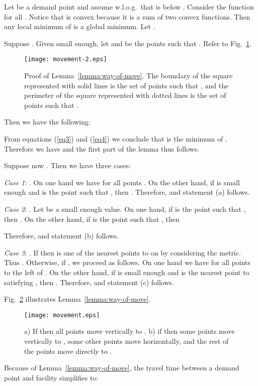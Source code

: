\documentclass[11pt,a4paper,oneside,onecolumn]{article}
\def\QED{\ensuremath{{\square}}}
\def\markatright#1{\leavevmode\unskip\nobreak\quad\hspace*{\fill}{#1}}
\newenvironment{proof}
{\begin{trivlist}\item[\hskip\labelsep{\bf Proof.}]}
{\markatright{\QED}\end{trivlist}}
\begin{document}
\begin{proof}
Let  be a demand point and assume w.l.o.g.\ that  is below
. Consider the function  for
all . Notice that  is convex because it is a sum of two
convex functions. Then any local minimum of  is a global minimum.
Let .

Suppose . Given  small enough, let
 and  be the points such that
. Refer to
Fig.~\ref{fig:movement-2}.
\begin{figure}[h]
  \centering
  \texttt{[image: movement-2.eps]}
  \caption{\small{Proof of Lemma~\ref{lemma:way-of-move}. The boundary of the square
    represented with solid lines is the set of points  such that
    , and the perimeter of the square represented with dotted
    lines is the set of points  such that .}}
  \label{fig:movement-2}
\end{figure}

Then we have the following:


From equations (\ref{eq3}) and (\ref{eq4}) we conclude that 
is the minimum of . Therefore we have  and the
first part of the lemma thus follows.

Suppose now . Then we have three
cases:

{\em Case 1}: . On one hand we have  for
all points . On the other hand, if 
is small enough and  is the point
such that , then
. Therefore,  and statement (a) follows.

{\em Case 2}: . Let  be a small enough value.
On one hand, if  is the point
such that , then
. 
On the other hand, if  is the point
such that , then

Therefore,  and statement (b)
follows.

{\em Case 3}: . If 
then  is one of the nearest points to  on  by considering
the  metric. Thus
.
Otherwise, if , we proceed as follows. On one hand we have
 for all points  to the left of . On the other
hand, if  is small enough and  is the nearest
point to  satisfying , then
.
Therefore,  and statement (c) follows.
\end{proof}
Fig.~\ref{fig:movement} illustrates Lemma~\ref{lemma:way-of-move}.
\begin{figure}[h]
  \centering
  \texttt{[image: movement.eps]}
  \caption{\small{a) If  then all points
  move vertically to .
  b) if  then some points move
  vertically to , some other points move horizontally, and the rest of the points move
  directly to .}}
  \label{fig:movement}
\end{figure}
Because of Lemma~\ref{lemma:way-of-move}, the travel time  between a
demand point  and facility  simplifies to:
\end{document}
